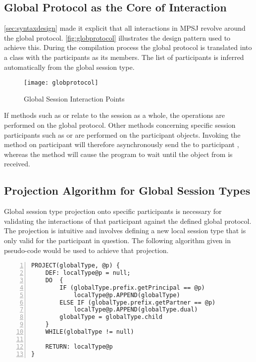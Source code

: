 \subsection{Global Protocol as the Core of Interaction}
\label{subsec:globprotocolcore}

\autoref{sec:syntaxdesign} made it explicit that all interactions in MPSJ revolve around the global protocol. \autoref{fig:globprotocol} illustrates the design pattern used to achieve this. During the compilation process the global protocol is translated into a class with the participants as its members. The list of participants is inferred automatically from the global session type.

\begin{figure}[H]
\begin{center}
\texttt{[image: globprotocol]}
\caption{Global Session Interaction Points}
\label{fig:globprotocol}
\end{center}
\end{figure}

If methods such as  or  relate to the session as a whole, the operations are performed on the global protocol. Other methods concerning specific session participants such as  or  are performed on the participant objects. Invoking the  method on participant  will therefore asynchronously send the  to participant , whereas the method  will cause the program to wait until the object from  is received.


\subsection{Projection Algorithm for Global Session Types}

Global session type projection onto specific participants is necessary for validating the interactions of that participant against the defined global protocol. The projection is intuitive and involves defining a new local session type that is only valid for the participant in question. The following algorithm given in pseudo-code would be used to achieve that projection. 


\begin{lstlisting}[basicstyle=\LISTINGSTYLE, numbers=left]
PROJECT(globalType, @p) {
	DEF: localType@p = null;
	DO	{
		IF (globalType.prefix.getPrincipal == @p)
			localType@p.APPEND(globalType)
		ELSE IF (globalType.prefix.getPartner == @p)
			localType@p.APPEND(globalType.dual)
		globalType = globalType.child
	}
	WHILE(globalType != null)

	RETURN: localType@p
}
\end{lstlisting}

